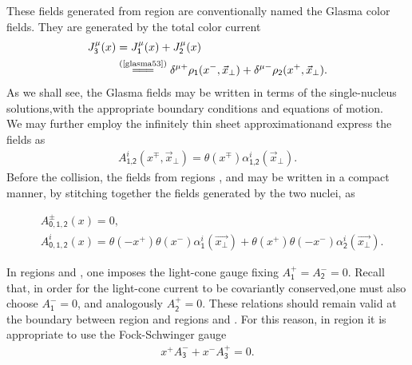 These fields generated from region {} are conventionally named the {\sffamily\color{ming}Glasma} color fields. They are generated by the total color current
\begin{align*}
    J^\mu_\textsf{3}(x)&=J^\mu_\textsf{1}(x)+J^\mu_\textsf{2}(x)\\
    &\stackrel{(\text{\cref{glasma53}})}{=\joinrel=\joinrel=}\delta^{\mu+}\rho_\textsf{1}(x^-,\vec{x}_\perp)+\delta^{\mu-}\rho_\textsf{2}(x^+,\vec{x}_\perp).
\end{align*}
As we shall see, the Glasma fields may be written in terms of the single-nucleus solutions,with the appropriate boundary conditions and equations of motion. \\
We may further employ the infinitely thin sheet approximationand express the fields as 
\begin{align*}
    A^i_{\textsf{1},\textsf{2}}(x^\mp,\vec{x}_\perp)=\theta(x^\mp)\alpha^i_{\textsf{1},\textsf{2}}(\vec{x}_\perp).
\end{align*}
Before the collision, the fields from regions {}, {} and {} may be written in a compact manner, by stitching together the fields generated by the two nuclei, as 
\begin{fullwidth}
\begin{equation}\label{sglasma6}
\begin{aligned}
    &A^{\pm}_{\textsf{0},\textsf{1},\textsf{2}}(x)=0,\\
    &A^i_{\textsf{0},\textsf{1},\textsf{2}}(x)=\theta(-x^+)\theta(x^-)\alpha^i_\textsf{1}(\vec{x_\perp})+\theta(x^+)\theta(-x^-)\alpha^i_\textsf{2}(\vec{x_\perp}).
\end{aligned}    
\end{equation}
\end{fullwidth}

In regions {} and {}, one imposes the light-cone gauge fixing $A^+_\textsf{1}=A^-_\textsf{2}=0$. Recall that, in order for the light-cone current to be covariantly conserved,one must also choose $A^-_{\textsf{1}}=0$, and analogously $A^+_{\textsf{2}}=0$. These relations should remain valid at the boundary between region {} and regions {} and {}. For this reason, in region {} it is appropriate to use the Fock-Schwinger gauge
\begin{align*}
    x^+A^-_\textsf{3}+x^-A^+_\textsf{3}=0.
\end{align*}

